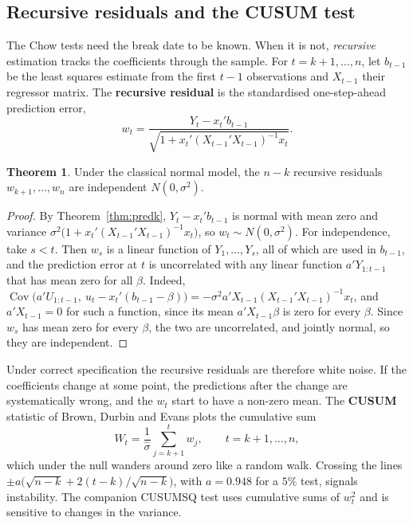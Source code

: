 \documentclass[11pt,a4paper]{article}
\numberwithin{equation}{section}
\DeclareMathOperator{\Cov}{Cov}
\theoremstyle{definition}
\newtheorem{thm}{Theorem}[subsection]
\begin{document}
\subsection{Recursive residuals and the CUSUM test}
\label{ssec:cusum}

The Chow tests need the break date to be known. When it is not, \emph{recursive} estimation tracks the coefficients through the sample. For
$t = k + 1, \dots, n$, let $b_{t-1}$ be the least squares estimate from the first $t - 1$ observations and $X_{t-1}$ their regressor matrix. The
\textbf{recursive residual} is the standardised one-step-ahead prediction error,
\[
w_t = \frac{Y_t - x_t'b_{t-1}}{\sqrt{1 + x_t'(X_{t-1}'X_{t-1})^{-1}x_t}} .
\]

\begin{thm}
\label{thm:recursive}
Under the classical normal model, the $n - k$ recursive residuals $w_{k+1}, \dots, w_n$ are independent $N(0, \sigma^2)$.
\end{thm}

\begin{proof}
By Theorem~\ref{thm:predk}, $Y_t - x_t'b_{t-1}$ is normal with mean zero and variance $\sigma^2\bigl(1 + x_t'(X_{t-1}'X_{t-1})^{-1}x_t\bigr)$, so $w_t \sim N(0, \sigma^2)$. For
independence, take $s < t$. Then $w_s$ is a linear function of $Y_1, \dots, Y_s$, all of which are used in $b_{t-1}$, and the prediction error at $t$ is
uncorrelated with any linear function $a'Y_{1:t-1}$ that has mean zero for all $\beta$. Indeed, $\Cov\bigl(a'U_{1:t-1},\ u_t - x_t'(b_{t-1} - \beta)\bigr) =
-\sigma^2a'X_{t-1}(X_{t-1}'X_{t-1})^{-1}x_t$, and $a'X_{t-1} = 0$ for such a function, since its mean $a'X_{t-1}\beta$ is zero for every $\beta$. Since $w_s$ has mean zero for every $\beta$, the two are
uncorrelated, and jointly normal, so they are independent.
\end{proof}

Under correct specification the recursive residuals are therefore white noise. If the coefficients change at some point, the predictions after the
change are systematically wrong, and the $w_t$ start to have a non-zero mean. The \textbf{CUSUM} statistic of Brown, Durbin and Evans plots the
cumulative sum
\[
W_t = \frac1{\hat\sigma}\sum_{j=k+1}^t w_j, \qquad t = k + 1, \dots, n ,
\]
which under the null wanders around zero like a random walk. Crossing the lines $\pm a\bigl(\sqrt{n - k} + 2(t - k)/\sqrt{n - k}\bigr)$, with $a = 0.948$ for a $5\%$ test,
signals instability. The companion CUSUMSQ test uses cumulative sums of $w_t^2$ and is sensitive to changes in the variance.
\end{document}
